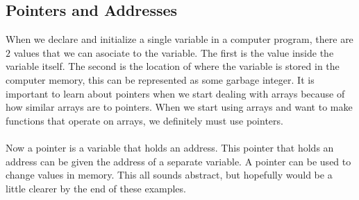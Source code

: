 \documentclass[a4paper, 12pt]{report}
\begin{document}
\begin{center}
\section{Pointers and Addresses}
\begin{comment}
\end{comment}
When we declare and initialize a single variable in a computer program, there are $2$ values that we can asociate to the variable.
The first is the value inside the variable itself.
The second is the location of where the variable is stored in the computer memory, this can be represented as some garbage integer.
It is important to learn about pointers when we start dealing with arrays because of how similar arrays are to pointers.
When we start using arrays and want to make functions that operate on arrays, we definitely must use pointers.
\\~\\Now a pointer is a variable that holds an address.
This pointer that holds an address can be given the address of a separate variable.
A pointer can be used to change values in memory.
This all sounds abstract, but hopefully would be a little clearer by the end of these examples.




\end{center}
\end{document}
